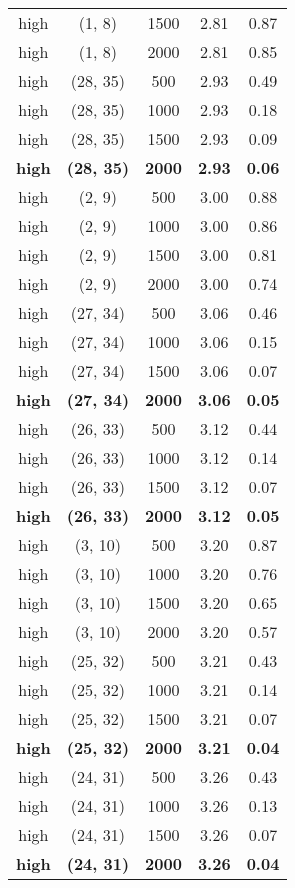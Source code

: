 \begin{tabular}{c c c c c}
high & (1, 8) &  1500 & 2.81 & 0.87 \\
high & (1, 8) &  2000 & 2.81 & 0.85 \\
high & (28, 35) &  500 & 2.93 & 0.49 \\
high & (28, 35) &  1000 & 2.93 & 0.18 \\
high & (28, 35) &  1500 & 2.93 & 0.09 \\
\textbf{high} & \textbf{(28, 35)} & \textbf{ 2000} & \textbf{2.93} & \textbf{0.06} \\
high & (2, 9) &  500 & 3.00 & 0.88 \\
high & (2, 9) &  1000 & 3.00 & 0.86 \\
high & (2, 9) &  1500 & 3.00 & 0.81 \\
high & (2, 9) &  2000 & 3.00 & 0.74 \\
high & (27, 34) &  500 & 3.06 & 0.46 \\
high & (27, 34) &  1000 & 3.06 & 0.15 \\
high & (27, 34) &  1500 & 3.06 & 0.07 \\
\textbf{high} & \textbf{(27, 34)} & \textbf{ 2000} & \textbf{3.06} & \textbf{0.05} \\
high & (26, 33) &  500 & 3.12 & 0.44 \\
high & (26, 33) &  1000 & 3.12 & 0.14 \\
high & (26, 33) &  1500 & 3.12 & 0.07 \\
\textbf{high} & \textbf{(26, 33)} & \textbf{ 2000} & \textbf{3.12} & \textbf{0.05} \\
high & (3, 10) &  500 & 3.20 & 0.87 \\
high & (3, 10) &  1000 & 3.20 & 0.76 \\
high & (3, 10) &  1500 & 3.20 & 0.65 \\
high & (3, 10) &  2000 & 3.20 & 0.57 \\
high & (25, 32) &  500 & 3.21 & 0.43 \\
high & (25, 32) &  1000 & 3.21 & 0.14 \\
high & (25, 32) &  1500 & 3.21 & 0.07 \\
\textbf{high} & \textbf{(25, 32)} & \textbf{ 2000} & \textbf{3.21} & \textbf{0.04} \\
high & (24, 31) &  500 & 3.26 & 0.43 \\
high & (24, 31) &  1000 & 3.26 & 0.13 \\
high & (24, 31) &  1500 & 3.26 & 0.07 \\
\textbf{high} & \textbf{(24, 31)} & \textbf{ 2000} & \textbf{3.26} & \textbf{0.04} \\

\end{tabular}

